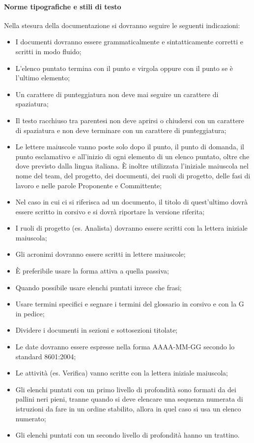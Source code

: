 \paragraph{Norme tipografiche e stili di testo}
\label{5.4}
Nella stesura della documentazione si dovranno seguire le seguenti indicazioni:
\begin{itemize}
\item I documenti dovranno essere grammaticalmente e sintatticamente corretti e scritti in modo fluido;
\item L'elenco puntato termina con il punto e virgola oppure con il punto se è l'ultimo elemento;
\item Un carattere di punteggiatura non deve mai seguire un carattere di spaziatura;
\item Il testo racchiuso tra parentesi non deve aprirsi o chiudersi con un carattere di spaziatura e non deve terminare con un carattere di punteggiatura;
\item Le lettere maiuscole vanno poste solo dopo il punto, il punto di domanda, il punto esclamativo e all'inizio di ogni elemento di un elenco puntato, oltre che dove previsto dalla lingua italiana. È inoltre utilizzata l'iniziale maiuscola nel nome del team, del progetto, dei documenti, dei ruoli di progetto, delle fasi di lavoro e nelle parole Proponente e Committente;
\item Nel caso in cui ci si riferisca ad un documento, il titolo di quest'ultimo dovrà essere scritto in corsivo e si dovrà riportare la versione riferita;
\item I ruoli di progetto (es. Analista) dovranno essere scritti con la lettera iniziale maiuscola;
\item Gli acronimi dovranno essere scritti in lettere maiuscole;
\item \`{E} preferibile usare la forma attiva a quella passiva;
\item Quando possibile usare elenchi puntati invece che frasi;
\item Usare termini specifici e segnare i termini del glossario in corsivo e con la G in pedice;
\item Dividere i documenti in sezioni e sottosezioni titolate;
\item Le date dovranno essere espresse nella forma AAAA-MM-GG secondo lo standard  8601:2004;
\item Le attività (es. Verifica) vanno scritte con la lettera iniziale maiuscola;
\item Gli elenchi puntati con un primo livello di profondità sono formati da dei pallini neri pieni, tranne quando si deve elencare una sequenza numerata di istruzioni da fare in un ordine stabilito, allora in quel caso si usa un elenco numerato;
\item Gli elenchi puntati con un secondo livello di profondità hanno un trattino.
\end{itemize}

